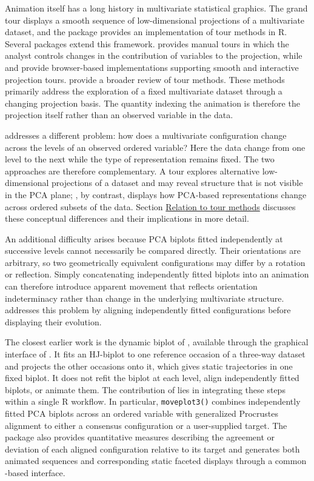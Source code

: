 Animation itself has a long history in multivariate statistical graphics. The grand tour \citep{Asimov1985} displays a smooth sequence of low-dimensional projections of a multivariate dataset, and the  package \citep{tourr} provides an implementation of tour methods in R. Several packages extend this framework.  \citep{spinifex} provides manual tours in which the analyst controls changes in the contribution of variables to the projection, while  \citep{langevitour} and  \citep{detourr} provide browser-based implementations supporting smooth and interactive projection tours. \citet{Lee2022} provide a broader review of tour methods. These methods primarily address the exploration of a fixed multivariate dataset through a changing projection basis. The quantity indexing the animation is therefore the projection itself rather than an observed variable in the data.

 addresses a different problem: how does a multivariate configuration change across the levels of an observed ordered variable? Here the data change from one level to the next while the type of representation remains fixed. The two approaches are therefore complementary. A tour explores alternative low-dimensional projections of a dataset and may reveal structure that is not visible in the PCA plane; , by contrast, displays how PCA-based representations change across ordered subsets of the data. Section \hyperref[tour-relation]{Relation to tour methods} discusses these conceptual differences and their implications in more detail.

An additional difficulty arises because PCA biplots fitted independently at successive levels cannot necessarily be compared directly. Their orientations are arbitrary, so two geometrically equivalent configurations may differ by a rotation or reflection. Simply concatenating independently fitted biplots into an animation can therefore introduce apparent movement that reflects orientation indeterminacy rather than change in the underlying multivariate structure.  addresses this problem by aligning independently fitted configurations before displaying their evolution.

The closest earlier work is the dynamic biplot of \citet{Egido2015}, available through the graphical interface of  \citep{dynBiplotGUI}. It fits an HJ-biplot to one reference occasion of a three-way dataset and projects the other occasions onto it, which gives static trajectories in one fixed biplot. It does not refit the biplot at each level, align independently fitted biplots, or animate them. The contribution of  lies in integrating these steps within a single R workflow. In particular, \texttt{moveplot3()} combines independently fitted PCA biplots across an ordered variable with generalized Procrustes alignment to either a consensus configuration or a user-supplied target. The package also provides quantitative measures describing the agreement or deviation of each aligned configuration relative to its target and generates both animated sequences and corresponding static faceted displays through a common -based interface.

